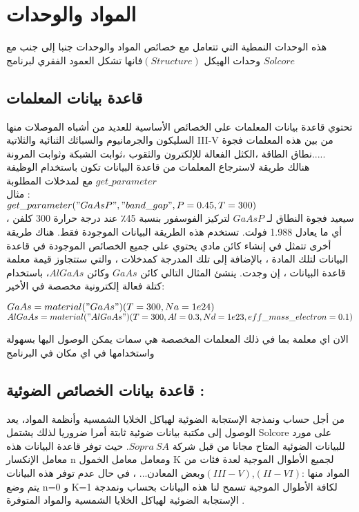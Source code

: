 \section{ المواد والوحدات }
هذه الوحدات النمطية التي تتعامل مع خصائص المواد والوحدات جنبا إلى جنب مع وحدات الهيكل $ (Structure)  $فانها تشكل العمود الفقري لبرنامج $ Solcore $ 
\subsection{   قاعدة بيانات المعلمات }
تحتوي قاعدة بيانات المعلمات على الخصائص الأساسية للعديد من أشباه الموصلات منها السليكون والجرمانيوم والسبائك الثنائية والثلاتية III-V من بين هذه المعلمات فجوة نطاق الطاقة ،الكثل الفعالة للإلكترون والثقوب ،ثوابت الشبكة وثوابت المرونة..... \\
هنالك طريقة لاسترجاع المعلمات من قاعدة البيانات تكون باستخدام الوظيفة $ get\_parameter  $ مع لمدخلات المطلوبة 
\\
مثال : \\
$ get\_parameter("GaAsP", "band\_gap", P=0.45, T=300) $
\\
سيعيد فجوة النطاق لـ $ GaAsP  $ لتركيز الفوسفور بنسبة 45٪ عند درجة حرارة 300 كلفن ، أي ما يعادل 1.988 فولت. تستخدم هذه الطريقة البيانات
الموجودة فقط. هناك طريقة أخرى تتمثل في إنشاء كائن مادي يحتوي على جميع الخصائص الموجودة في قاعدة البيانات لتلك المادة ، بالإضافة إلى تلك المدرجة كمدخلات ، والتي ستتجاوز قيمة معلمة قاعدة البيانات ، إن وجدت. ينشئ المثال التالي كائن $ GaAs $ وكائن $ AlGaAs  $، باستخدام كتلة فعالة إلكترونية مخصصة في الأخير:
\\
\begin{flushleft}
	$ GaAs = material("GaAs")(T=300, Na=1e24) $ \\
	$ AlGaAs = material("AlGaAs")(T=300, Al=0.3, Nd=1e23, eff\_mass\_electron=0.1) $ 
\end{flushleft}
الان اي معلمة بما في ذلك المعلمات المخصصة هي سمات يمكن الوصول اليها بسهولة واستخدامها في اي مكان في البرنامج 
\subsection{  قاعدة بيانات الخصائص الضوئية : }
من أجل حساب ونمذجة الإستجابة الضوئية لهياكل الخلايا الشمسية وأنظمة المواد، يعد الوصول إلى مكتبة بيانات ضوئية ثابتة أمرا ضروريا لذلك 
يشتمل Solcore على مورد للبيانات الضوئية المتاح مجانا من قبل شركة $ Sopra ~SA  $. حيث توفر قاعدة البيانات هذه معامل الإنكسار n ومعامل   معامل الخمول K  لجميع الأطوال الموجية لعدة فئات من المواد منها :$ (II-VI)  $,$ (III -V)  $وبعض المعادن... ، في حال عدم توفر هذه البيانات يتم وضع  n=0 و K=1 لكافة الأطوال الموجية         
تسمح لنا هذه البيانات بحساب ونمدجة الإستجابة الضوئية لهياكل الخلايا الشمسية والمواد المتوفرة .
